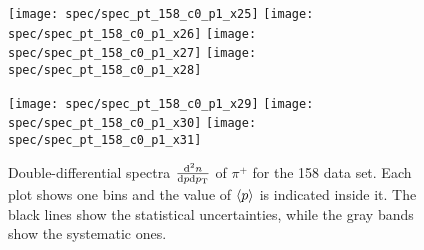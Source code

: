 \begin{figure}[!ht]
  \texttt{[image: spec/spec\_pt\_158\_c0\_p1\_x25]}
  \texttt{[image: spec/spec\_pt\_158\_c0\_p1\_x26]}
  \texttt{[image: spec/spec\_pt\_158\_c0\_p1\_x27]}
  \texttt{[image: spec/spec\_pt\_158\_c0\_p1\_x28]}

  \texttt{[image: spec/spec\_pt\_158\_c0\_p1\_x29]}
  \texttt{[image: spec/spec\_pt\_158\_c0\_p1\_x30]}
  \texttt{[image: spec/spec\_pt\_158\_c0\_p1\_x31]}

  \caption{Double-differential spectra $\frac{\text{d}^2n}{\text{d}p\text{d}p_\text{T}}$
    of $\pi^+$ for the 158 \GeVc data set. Each plot shows one \pp bins and the value
    of $\langle p\rangle$ is indicated inside it. The black lines show the statistical
    uncertainties, while the gray bands show the systematic ones.}
  \label{fig:hadron:spec:dedx:all158:c0p1}
\end{figure}

